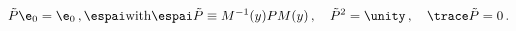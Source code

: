 \begin{equation}
\tilde{P}\e_0 =\e_0\,, \espai \mbox{with} \espai \tilde{P}\equiv M^{-1}(y) P
M(y)\,, \quad
\tilde{P}^2=\unity \,,\quad  \trace \tilde{P}=0\,.
\end{equation}

